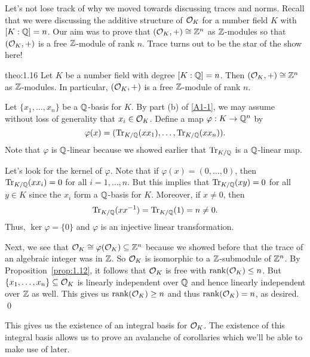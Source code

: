 Let's not lose track of why we moved towards discussing traces and norms. 
Recall that we were discussing the additive structure of ${\cal O}_K$ 
for a number field $K$ with $[K : \mathbb{Q}] = n$. 
Our aim was to prove that $({\cal O}_K, +) \cong \mathbb{Z}^n$ as $\mathbb{Z}$-modules 
so that $({\cal O}_K, +)$ is a free $\mathbb{Z}$-module of rank $n$. Trace turns 
out to be the star of the show here!

\begin{theo}{theo:1.16}
    Let $K$ be a number field with degree $[K : \mathbb{Q}] = n$. Then 
    $({\cal O}_K, +) \cong \mathbb{Z}^n$ as $\mathbb{Z}$-modules. In particular, 
    $({\cal O}_K, +)$ is a free $\mathbb{Z}$-module of rank $n$. 
\end{theo}\vspace{-0.25cm}
\begin{pf}
    Let $\{x_1, \dots, x_n\}$ be a $\mathbb{Q}$-basis for $K$. By part (b) of \ref{A1-1}, 
    we may assume without loss of generality that $x_i \in {\cal O}_K$. Define 
    a map $\varphi : K \to \mathbb{Q}^n$ by 
    \[ \varphi(x) = (\operatorname{Tr}_{K/\mathbb{Q}}(xx_1), \dots, \operatorname{Tr}_{K/\mathbb{Q}}(xx_n)). \] 
    Note that $\varphi$ is $\mathbb{Q}$-linear because we showed earlier that 
    $\operatorname{Tr}_{K/\mathbb{Q}}$ is a $\mathbb{Q}$-linear map. 

    Let's look for the kernel of $\varphi$. Note that if $\varphi(x) = 
    (0, \dots, 0)$, then $\operatorname{Tr}_{K/\mathbb{Q}}(xx_i) = 0$ for all $i = 1, \dots, n$. 
    But this implies that $\operatorname{Tr}_{K/\mathbb{Q}}(xy) = 0$ for all $y \in K$ since 
    the $x_i$ form a $\mathbb{Q}$-basis for $K$. Moreover, if $x \neq 0$, then
    \[ \operatorname{Tr}_{K/\mathbb{Q}}(xx^{-1}) = \operatorname{Tr}_{K/\mathbb{Q}}(1) = n \neq 0. \] 
    Thus, $\ker\varphi = \{0\}$ and $\varphi$ is an injective linear transformation.

    Next, we see that ${\cal O}_K \cong \varphi({\cal O}_K) \subseteq \mathbb{Z}^n$
    because we showed before that the trace of an algebraic integer 
    was in $\mathbb{Z}$. So ${\cal O}_K$ is isomorphic to a $\mathbb{Z}$-submodule of $\mathbb{Z}^n$. By 
    Proposition~\ref{prop:1.12}, it follows that ${\cal O}_K$ is free 
    with $\operatorname{rank}({\cal O}_K) \leq n$. But $\{x_1, \dots, x_n\} \subseteq 
    {\cal O}_K$ is linearly independent over $\mathbb{Q}$ and hence linearly independent 
    over $\mathbb{Z}$ as well. This gives us $\operatorname{rank}({\cal O}_K) \geq n$ and thus 
    $\operatorname{rank}({\cal O}_K) = n$, as desired. \qed
\end{pf}\vspace{-0.25cm}

This gives us the existence of an integral basis for ${\cal O}_K$. The existence 
of this integral basis allows us to prove an avalanche of 
corollaries which we'll be able to make use of later. 

